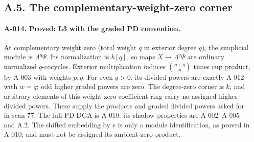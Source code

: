 \subsection{A.5. The complementary-weight-zero corner}

\paragraph{A-014. Proved: L3 with the graded PD convention.}
At complementary weight zero (total weight $q$ in exterior degree
$q$), the simplicial module is $\Lambda^q\Psi$. Its normalization
is $k[q]$, so maps $X\to\Lambda^q\Psi$ are ordinary normalized
$q$-cocycles. Exterior multiplication induces
$\binom{p+q}{p}$ times cup product, by A-003 with weights $p,q$.
For even $q>0$, its divided powers are exactly A-012 with $w=q$;
odd higher graded powers are zero. The degree-zero corner is $k$,
and arbitrary elements of this weight-zero coefficient ring carry
no assigned higher divided powers. These supply the
products and graded divided powers asked for in scan 77. The full
PD-DGA is A-010; its shadow properties are A-002--A-005 and A.2.
The shifted embedding by $e$ is only a module identification, as
proved in A-010, and must not be assigned its ambient zero product.
